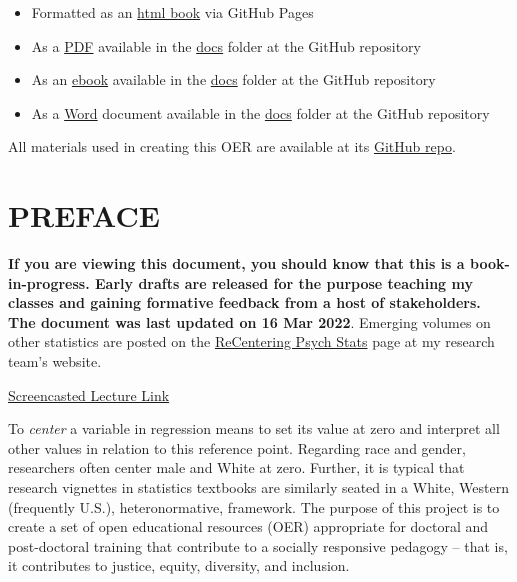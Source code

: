\documentclass[
  11pt,
]{book}
\providecommand{\tightlist}{%
  \setlength{\itemsep}{0pt}\setlength{\parskip}{0pt}}
\begin{document}
\begin{itemize}
\tightlist
\item
  Formatted as an \href{https://lhbikos.github.io/ReC_MultivModel/}{html book} via GitHub Pages
\item
  As a \href{https://github.com/lhbikos/ReC_MultivModel/blob/main/docs/ReC_MultMod.pdf}{PDF} available in the \href{https://github.com/lhbikos/ReC_MultivModel/tree/main/docs}{docs} folder at the GitHub repository
\item
  As an \href{https://github.com/lhbikos/ReC_MultivModel/blob/main/docs/ReC_MultMod.epub}{ebook} available in the \href{https://github.com/lhbikos/ReC_MultivModel/tree/main/docs}{docs} folder at the GitHub repository
\item
  As a \href{https://github.com/lhbikos/ReC_MultivModel/blob/main/docs/ReC_MultMod.docx}{Word} document available in the \href{https://github.com/lhbikos/ReC_MultivModel/tree/main/docs}{docs} folder at the GitHub repository
\end{itemize}

All materials used in creating this OER are available at its \href{https://github.com/lhbikos/ReC_MultivModel}{GitHub repo}.

\hypertarget{preface}{%
\chapter*{PREFACE}\label{preface}}

\textbf{If you are viewing this document, you should know that this is a book-in-progress. Early drafts are released for the purpose teaching my classes and gaining formative feedback from a host of stakeholders. The document was last updated on 16 Mar 2022}. Emerging volumes on other statistics are posted on the \href{https://lhbikos.github.io/BikosRVT/ReCenter.html}{ReCentering Psych Stats} page at my research team's website.

\href{https://spu.hosted.panopto.com/Panopto/Pages/Viewer.aspx?id=c932455e-ef06-444a-bdca-acf7012d759a}{Screencasted Lecture Link}

To \emph{center} a variable in regression means to set its value at zero and interpret all other values in relation to this reference point. Regarding race and gender, researchers often center male and White at zero. Further, it is typical that research vignettes in statistics textbooks are similarly seated in a White, Western (frequently U.S.), heteronormative, framework. The purpose of this project is to create a set of open educational resources (OER) appropriate for doctoral and post-doctoral training that contribute to a socially responsive pedagogy -- that is, it contributes to justice, equity, diversity, and inclusion.
\end{document}
